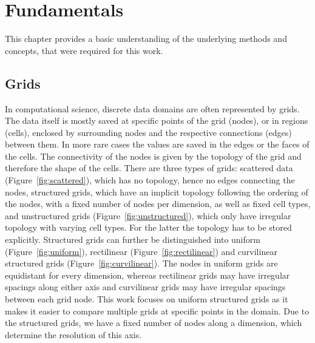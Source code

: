 \chapter{Fundamentals}

This chapter provides a basic understanding of the underlying methods
and concepts, that were required for this work.

\section{Grids}

In computational science, discrete data domains are often represented by
grids. The data itself is mostly saved at specific points of the grid
(nodes), or in regions (cells), enclosed by surrounding nodes and the
respective connections (edges) between them. In more rare cases the
values are saved in the edges or the faces of the cells. The
connectivity of the nodes is given by the topology of the grid and
therefore the shape of the cells. There are three types of grids:
scattered data (Figure~\ref{fig:scattered}), which has no topology,
hence no edges connecting the nodes, structured grids, which have an
implicit topology following the ordering of the nodes, with a fixed
number of nodes per dimension, as well as fixed cell types, and
unstructured grids (Figure~\ref{fig:unstructured}), which only have
irregular topology with varying cell types. For the latter the topology
has to be stored explicitly. Structured grids can further be
distinguished into uniform (Figure~\ref{fig:uniform}), rectilinear
(Figure~\ref{fig:rectilinear}) and curvilinear structured grids
(Figure~\ref{fig:curvilinear}). The nodes in uniform grids are
equidistant for every dimension, whereas rectilinear grids may have
irregular spacings along either axis and curvilinear grids may have
irregular spacings between each grid node. This work focuses on uniform
structured grids as it makes it easier to compare multiple grids at
specific points in the domain. Due to the structured grids, we have a
fixed number of nodes along a dimension, which determine the resolution
of this axis.

